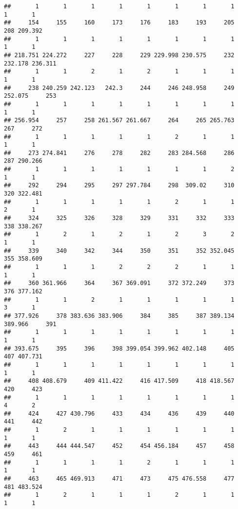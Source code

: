 \documentclass[]{article}
\begin{document}
\begin{verbatim}
##       1       1       1       1       1       1       1       1       1       1 
##     154     155     160     173     176     183     193     205     208 209.392 
##       1       1       1       1       1       1       1       1       1       1 
## 218.751 224.272     227     228     229 229.998 230.575     232 232.178 236.311 
##       1       1       2       1       2       1       1       1       1       1 
##     238 240.259 242.123   242.3     244     246 248.958     249 252.075     253 
##       1       1       1       1       1       1       1       1       1       1 
## 256.954     257     258 261.567 261.667     264     265 265.763     267     272 
##       1       1       1       1       1       2       1       1       1       1 
##     273 274.841     276     278     282     283 284.568     286     287 290.266 
##       1       1       1       1       1       1       1       2       1       1 
##     292     294     295     297 297.784     298  309.02     310     320 322.481 
##       1       1       1       1       1       2       1       1       2       1 
##     324     325     326     328     329     331     332     333     338 338.267 
##       1       2       1       2       1       2       3       2       1       1 
##     339     340     342     344     350     351     352 352.045     355 358.609 
##       1       1       1       2       2       2       1       1       1       1 
##     360 361.966     364     367 369.091     372 372.249     373     376 377.162 
##       1       1       2       1       1       1       1       1       3       1 
## 377.926     378 383.636 383.906     384     385     387 389.134 389.966     391 
##       1       1       1       1       1       1       1       1       1       1 
## 393.675     395     396     398 399.054 399.962 402.148     405     407 407.731 
##       1       1       1       1       1       1       1       1       1       1 
##     408 408.679     409 411.422     416 417.509     418 418.567     420     423 
##       1       1       1       1       1       1       1       1       4       2 
##     424     427 430.796     433     434     436     439     440     441     442 
##       1       2       1       1       1       1       1       1       1       1 
##     443     444 444.547     452     454 456.184     457     458     459     461 
##       1       1       1       1       2       1       1       1       1       1 
##     463     465 469.913     471     473     475 476.558     477     481 483.524 
##       1       2       1       1       1       2       1       1       1       1 

\end{verbatim}
\end{document}
